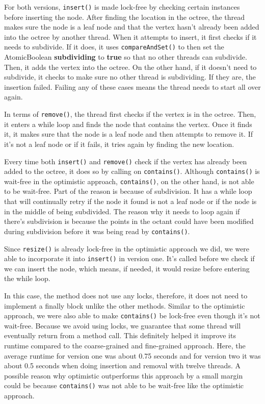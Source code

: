 \documentclass[conference]{IEEEtran}
\begin{document}
\indent \indent For both versions, \verb|insert()| is made lock-free by checking certain instances before inserting the node. After finding the location in the octree, the thread makes sure the node is a leaf node and that the vertex hasn't already been added into the octree by another thread. When it attempts to insert, it first checks if it needs to subdivide. If it does, it uses \verb|compareAndSet()| to then set the AtomicBoolean \textbf{subdividing} to \textbf{true} so that no other threads can subdivide. Then, it adds the vertex into the octree. On the other hand, if it doesn't need to subdivide, it checks to make sure no other thread is subdividing. If they are, the insertion failed. Failing any of these cases means the thread needs to start all over again.

\indent \indent In terms of \verb|remove()|, the thread first checks if the vertex is in the octree. Then, it enters a while loop and finds the node that contains the vertex. Once it finds it, it makes sure that the node is a leaf node and then attempts to remove it. If it's not a leaf node or if it fails, it tries again by finding the new location.

\indent \indent Every time both \verb|insert()| and \verb|remove()| check if the vertex has already been added to the octree, it does so by calling on \verb|contains()|. Although \verb|contains()| is wait-free in the optimistic approach, \verb|contains()|, on the other hand, is not able to be wait-free. Part of the reason is because of subdivision. It has a while loop that will continually retry if the node it found is not a leaf node or if the node is in the middle of being subdivided. The reason why it needs to loop again if there’s subdivision is because the points in the octant could have been modified  during subdivision before it was being read by \verb|contains()|.

\indent \indent Since \verb|resize()| is already lock-free in the optimistic approach we did, we were able to incorporate it into \verb|insert()| in version one. It's called before we check if we can insert the node, which means, if needed, it would resize before entering the while loop.

\indent \indent In this case, the method does not use any locks, therefore, it does not need to implement a finally block unlike the other methods. Similar to the optimistic approach, we were also able to make \verb|contains()| be lock-free even though it’s not wait-free. Because we avoid using locks, we guarantee that some thread will eventually return from a method call. This definitely helped it improve its runtime compared to the coarse-grained and fine-grained approach. Here, the average runtime for version one was about 0.75 seconds and for version two it was about 0.5 seconds when doing insertion and removal with twelve threads. A possible reason why optimistic outperforms this approach by a small margin could be because \verb|contains()| was not able to be wait-free like the optimistic approach.
\end{document}
